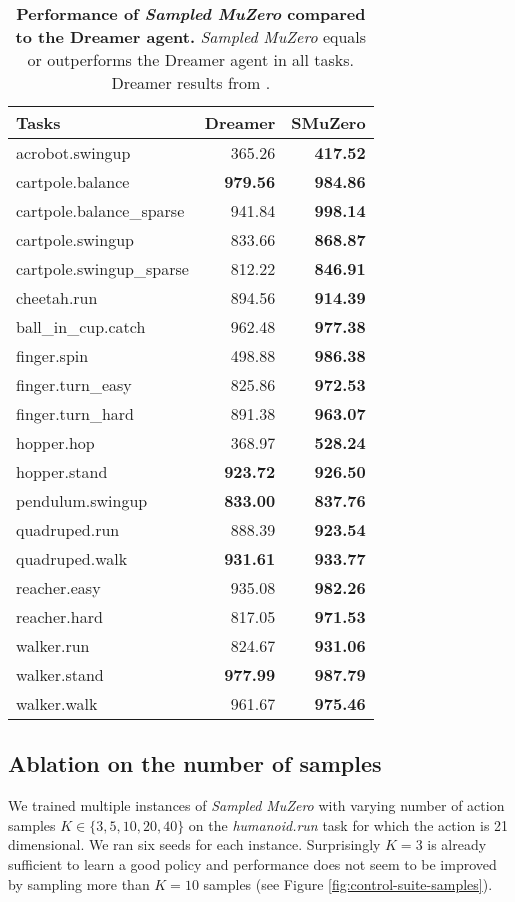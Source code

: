 \documentclass{article}
\newcommand{\smuzero}{\emph{Sampled MuZero}}
\begin{document}
\begin{table}[t]
\begin{tabularx}{\columnwidth}{l rr}

\toprule
Tasks & Dreamer & SMuZero \\
\midrule
acrobot.swingup & 365.26 & \textbf{417.52}\\
cartpole.balance & \textbf{979.56} & \textbf{984.86}\\
cartpole.balance\_sparse & 941.84 & \textbf{998.14}\\
cartpole.swingup & 833.66 & \textbf{868.87}\\
cartpole.swingup\_sparse & 812.22 & \textbf{846.91}\\
cheetah.run & 894.56 & \textbf{914.39}\\
ball\_in\_cup.catch & 962.48 & \textbf{977.38}\\
finger.spin & 498.88 & \textbf{986.38}\\
finger.turn\_easy & 825.86 & \textbf{972.53}\\
finger.turn\_hard & 891.38 & \textbf{963.07}\\
hopper.hop & 368.97 & \textbf{528.24}\\
hopper.stand & \textbf{923.72} & \textbf{926.50}\\
pendulum.swingup & \textbf{833.00} & \textbf{837.76}\\
quadruped.run & 888.39 & \textbf{923.54}\\
quadruped.walk & \textbf{931.61} & \textbf{933.77}\\
reacher.easy & 935.08 & \textbf{982.26}\\
reacher.hard & 817.05 & \textbf{971.53}\\
walker.run & 824.67 & \textbf{931.06}\\
walker.stand & \textbf{977.99} & \textbf{987.79}\\
walker.walk & 961.67 & \textbf{975.46}\\
\bottomrule
\end{tabularx}
 
\caption{
\label{tab:dreamer-results}
\textbf{Performance of \smuzero{} compared to the Dreamer agent.} \smuzero{} equals or outperforms the Dreamer agent in all tasks. Dreamer results from \cite{hafner2019dream}.
}
\end{table}

\subsection{Ablation on the number of samples}
We trained multiple instances of \smuzero{} with varying number of action samples $K \in \{3,5,10,20,40\}$ on the \emph{humanoid.run} task for which the action is 21 dimensional. We ran six seeds for each instance. Surprisingly $K=3$ is already sufficient to learn a good policy and performance does not seem to be improved by sampling more than $K=10$ samples (see Figure \ref{fig:control-suite-samples}).
\end{document}
